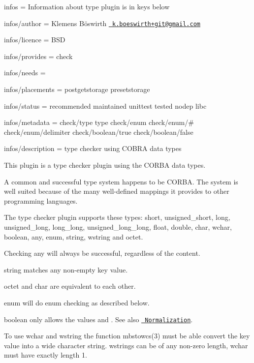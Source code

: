 
\begin{DoxyItemize}
\item infos = Information about type plugin is in keys below
\item infos/author = Klemens Böswirth \href{mailto:k.boeswirth+git@gmail.com}{\texttt{ k.\+boeswirth+git@gmail.\+com}}
\item infos/licence = B\+SD
\item infos/provides = check
\item infos/needs =
\item infos/placements = postgetstorage presetstorage
\item infos/status = recommended maintained unittest tested nodep libc
\item infos/metadata = check/type type check/enum check/enum/\# check/enum/delimiter check/boolean/true check/boolean/false
\item infos/description = type checker using C\+O\+B\+RA data types
\end{DoxyItemize}

This plugin is a type checker plugin using the {\ttfamily C\+O\+R\+BA} data types.

A common and successful type system happens to be C\+O\+R\+BA. The system is well suited because of the many well-\/defined mappings it provides to other programming languages.

The type checker plugin supports these types\+: {\ttfamily short}, {\ttfamily unsigned\+\_\+short}, {\ttfamily long}, {\ttfamily unsigned\+\_\+long}, {\ttfamily long\+\_\+long}, {\ttfamily unsigned\+\_\+long\+\_\+long}, {\ttfamily float}, {\ttfamily double}, {\ttfamily char}, {\ttfamily wchar}, {\ttfamily boolean}, {\ttfamily any}, {\ttfamily enum}, {\ttfamily string}, {\ttfamily wstring} and {\ttfamily octet}.


\begin{DoxyItemize}
\item Checking {\ttfamily any} will always be successful, regardless of the content.
\item {\ttfamily string} matches any non-\/empty key value.
\item {\ttfamily octet} and {\ttfamily char} are equivalent to each other.
\item {\ttfamily enum} will do enum checking as described below.
\item {\ttfamily boolean} only allows the values {} and {}. See also \href{\#normalization}{\texttt{ Normalization}}.
\item To use {\ttfamily wchar} and {\ttfamily wstring} the function {\ttfamily mbstowcs(3)} must be able convert the key value into a wide character string. {\ttfamily wstring}s can be of any non-\/zero length, {\ttfamily wchar} must have exactly length 1.
\end{DoxyItemize}

